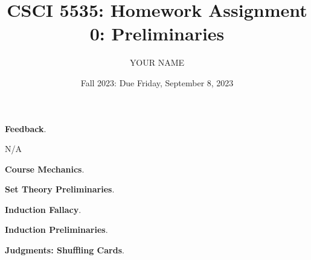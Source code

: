 \documentclass[11pt]{exam}
\title{CSCI 5535: Homework Assignment 0: Preliminaries}
\date{Fall 2023: Due Friday, September 8, 2023}
\author{YOUR NAME}
\begin{document}
\maketitle

\begin{questions}
\question \textbf{Feedback}. 

N/A

\question \textbf{Course Mechanics}.

\question \textbf{Set Theory Preliminaries}. 

\question \textbf{Induction Fallacy}.

\question \textbf{Induction Preliminaries}.

\question \textbf{Judgments: Shuffling Cards}.

\end{questions}
\end{document}
